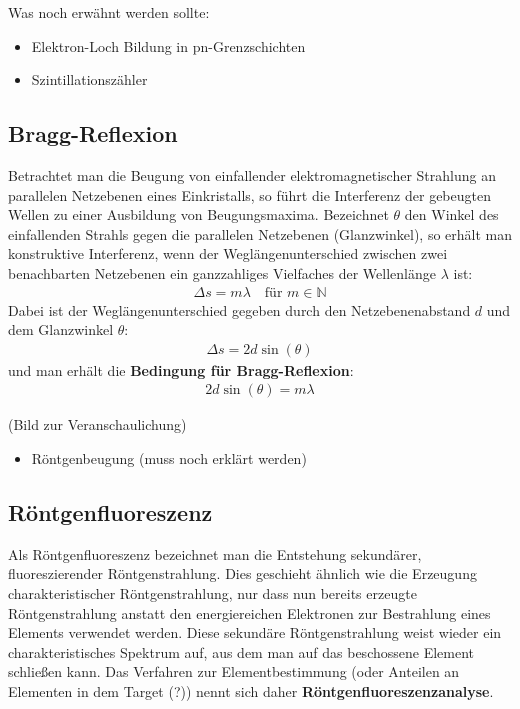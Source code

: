 \documentclass[10pt, a4paper]{article}
\begin{document}
Was noch erwähnt werden sollte:
\begin{itemize}
  \item Elektron-Loch Bildung in pn-Grenzschichten
  \item Szintillationszähler
\end{itemize}

\subsection{Bragg-Reflexion}
Betrachtet man die Beugung von einfallender elektromagnetischer Strahlung an parallelen Netzebenen eines Einkristalls, so führt die Interferenz der gebeugten Wellen zu einer Ausbildung von Beugungsmaxima.
Bezeichnet $\theta$ den Winkel des einfallenden Strahls gegen die parallelen Netzebenen (Glanzwinkel), so erhält man konstruktive Interferenz, wenn der Weglängenunterschied zwischen zwei benachbarten Netzebenen ein ganzzahliges Vielfaches der Wellenlänge $\lambda$ ist:
\begin{align}
  \Delta s = m \lambda \quad \text{für } m \in \mathbb{N}
\end{align}
Dabei ist der Weglängenunterschied gegeben durch den Netzebenenabstand $d$ und dem Glanzwinkel $\theta$:
\begin{align}
  \Delta s = 2 d \sin(\theta)
\end{align}
und man erhält die \textbf{Bedingung für Bragg-Reflexion}:
\begin{align}
  2 d \sin(\theta) = m \lambda
\end{align}

(Bild zur Veranschaulichung)

\begin{itemize}
  \item Röntgenbeugung (muss noch erklärt werden)
\end{itemize}

\subsection{Röntgenfluoreszenz}
Als Röntgenfluoreszenz bezeichnet man die Entstehung sekundärer, fluoreszierender Röntgenstrahlung.
Dies geschieht ähnlich wie die Erzeugung charakteristischer Röntgenstrahlung, nur dass nun bereits erzeugte Röntgenstrahlung anstatt den energiereichen Elektronen zur Bestrahlung eines Elements verwendet werden.
Diese sekundäre Röntgenstrahlung weist wieder ein charakteristisches Spektrum auf, aus dem man auf das beschossene Element schließen kann.
Das Verfahren zur Elementbestimmung (oder Anteilen an Elementen in dem Target (?)) nennt sich daher \textbf{Röntgenfluoreszenzanalyse}.
\end{document}
